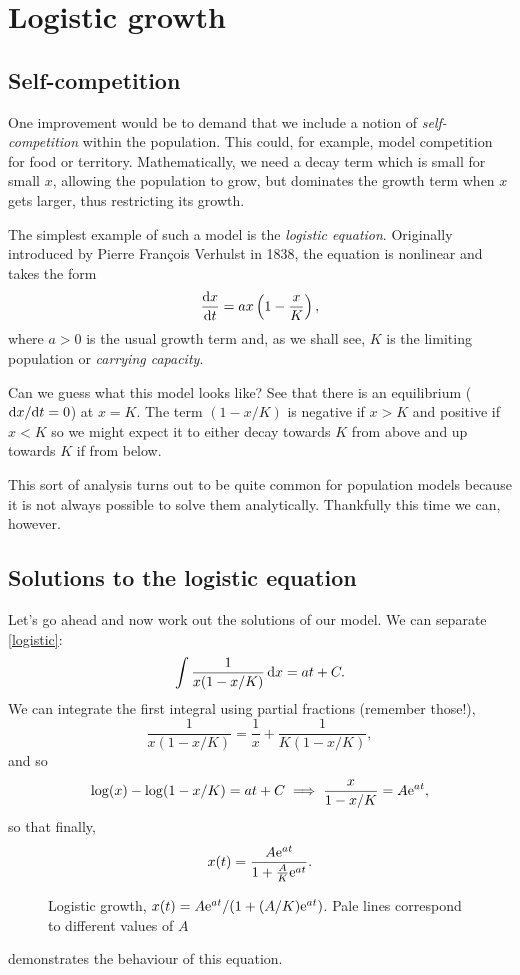 \documentclass[main.tex]{subfiles}
\begin{document}
\section{Logistic growth}
\label{sec:logistic-growth}
\subsection{Self-competition}
One improvement would be to demand that we include a notion of \emph{self-competition} within the population. This could, for example, model competition for food or territory. Mathematically, we need a decay term which is small for small $x$, allowing the population to grow, but dominates the growth term when $x$ gets larger, thus restricting its growth. 

The simplest example of such a model is the \emph{logistic equation}. Originally introduced by Pierre Fran\c{c}ois Verhulst in 1838, the equation is nonlinear and takes the form
\begin{equation}
\label{logistic}
\fd{x}{t} = a x\left(1-\frac{x}{K}\right),
\end{equation}
where $a>0$ is the usual growth term and, as we shall see, $K$ is the limiting population or \emph{carrying capacity}. 

Can we guess what this model looks like?  See that there is an equilibrium ($\fd{x}{t} = 0$) at $x=K$. The term $(1-x/K)$ is negative if $x>K$ and positive if $x<K$ so we might expect it to either decay towards $K$ from above and up towards $K$ if from below. 

This sort of analysis turns out to be quite common for population models because it is not always possible to solve them analytically. Thankfully this time we can, however.

\subsection{Solutions to the logistic equation}
Let's go ahead and now work out the solutions of our model. We can separate \cref{logistic}:
\begin{equation}
\int\frac{1}{x(1 - x/K)}\,\mathrm{d}x = at + C.
\end{equation}
We can integrate the first integral using partial fractions (remember those!),
\begin{equation}
\frac{1}{x(1 - x/K)} = \frac{1}{x} + \frac{1}{K\left(1-x/K\right)},
\end{equation}
and so
\begin{equation}
\log(x) - \log(1-x/K)  =a t+C \implies   \frac{x}{1-x/K}  =   A\mathrm{e}^{at},
\end{equation}
so that finally,
\begin{equation}
\label{logsol}
x(t) = \frac{A \mathrm{e}^{a t}}{1+ \frac{A}{K}\mathrm{e}^{at}}.
 \end{equation}
%
\begin{figure}%
	\centering
	
	\caption{Logistic growth, $x(t) = A\mathrm{e}^{a t}/(1+(A/K)\mathrm{e}^{at})$. Pale lines correspond to different values of $A$}
	\label{fig:logistic-growth}
\end{figure}%
 demonstrates the behaviour of this equation.
\end{document}
